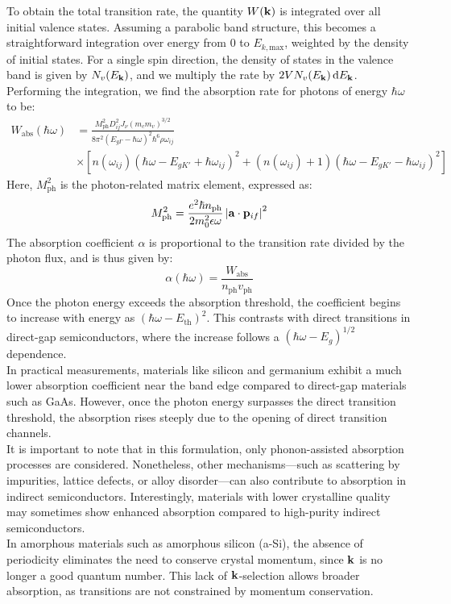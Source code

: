 To obtain the total transition rate, the quantity \( W(\vb{k}) \) is integrated over all initial valence states. Assuming a parabolic band structure, this becomes a straightforward integration over energy from 0 to \( E_{k,\text{max}} \), weighted by the density of initial states. For a single spin direction, the density of states in the valence band is given by \( N_v(E_{\vb{k}}) \), and we multiply the rate by \( 2V N_v(E_{\vb{k}}) \dd{E_{\vb{k}}} \). Performing the integration, we find the absorption rate for photons of energy \( \hbar \omega \) to be:
\begin{equation}
	\begin{aligned}
		W_{\text{abs}}(\hbar \omega) & = \frac{M_{\text{ph}}^2 D_{ij}^2 J_\nu (m_c m_v)^{3/2}}{8 \pi^2 (E_{g\Gamma} - \hbar \omega)^2 \hbar^6 \rho \omega_{ij}}                                                            \\
		                             & \times \left[ n(\omega_{ij}) \left( \hbar \omega - E_{gK'} + \hbar \omega_{ij} \right)^2 + (n(\omega_{ij}) + 1) \left( \hbar \omega - E_{gK'} - \hbar \omega_{ij} \right)^2 \right]
	\end{aligned}
\end{equation}
Here, \( M_{\text{ph}}^2 \) is the photon-related matrix element, expressed as:
\begin{equation}
	M_{\text{ph}}^2 = \frac{e^2 \hbar n_{\text{ph}}}{2 m_0^2 \epsilon \omega} \left| \vb{a} \cdot \vb{p}_{if} \right|^2
\end{equation}
The absorption coefficient \( \alpha \) is proportional to the transition rate divided by the photon flux, and is thus given by:
\[
	\alpha(\hbar \omega) = \frac{W_{\text{abs}}}{n_{\text{ph}} v_{\text{ph}}}
\]
Once the photon energy exceeds the absorption threshold, the coefficient begins to increase with energy as \( (\hbar \omega - E_{\text{th}})^2 \). This contrasts with direct transitions in direct-gap semiconductors, where the increase follows a \( (\hbar \omega - E_g)^{1/2} \) dependence.\\
In practical measurements, materials like silicon and germanium exhibit a much lower absorption coefficient near the band edge compared to direct-gap materials such as GaAs. However, once the photon energy surpasses the direct transition threshold, the absorption rises steeply due to the opening of direct transition channels.\\
It is important to note that in this formulation, only phonon-assisted absorption processes are considered. Nonetheless, other mechanisms—such as scattering by impurities, lattice defects, or alloy disorder—can also contribute to absorption in indirect semiconductors. Interestingly, materials with lower crystalline quality may sometimes show enhanced absorption compared to high-purity indirect semiconductors.\\
In amorphous materials such as amorphous silicon (a-Si), the absence of periodicity eliminates the need to conserve crystal momentum, since \( \vb{k} \) is no longer a good quantum number. This lack of \( \vb{k} \)-selection allows broader absorption, as transitions are not constrained by momentum conservation.


